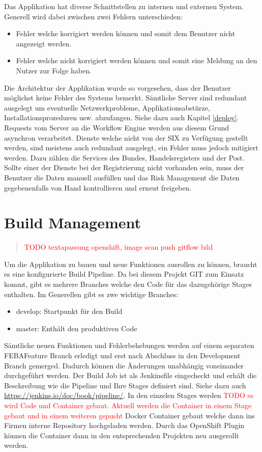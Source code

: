 Das Applikation hat diverse Schnittstellen zu internen und externen System. Generell wird dabei zwischen zwei Fehlern unterschieden:
\begin{itemize}
	\item Fehler welche korrigiert werden können und somit dem Benutzer nicht angezeigt werden.
	\item Fehler welche nicht korrigiert werden können und somit eine Meldung an den Nutzer zur Folge haben.
\end{itemize}
Die Architektur der Applikation wurde so vorgesehen, dass der Benutzer möglichst keine Fehler des Systems bemerkt. Sämtliche Server sind redundant ausgelegt um eventuelle Netzwerkprobleme, Applikationsabstürze, Installationsprozeduren usw. abzufangen. Siehe dazu auch Kapitel \ref{deploy}. Requests vom Server an die Workflow Engine werden aus diesem Grund asynchron verarbeitet.\newline
Dienste welche nicht von der SIX zu Verfügung gestellt werden, sind meistens auch redundant ausgelegt, ein Fehler muss jedoch mitigiert werden. Dazu zählen die Services des Bundes, Handelsregisters und der Post. Sollte einer der Dienste bei der Registrierung nicht vorhanden sein, muss der Benutzer die Daten manuell ausfüllen und das Risk Management die Daten gegebenenfalls von Hand kontrollieren und erneut freigeben.

\section{Build Management}
\label{build}
\begin{quote}
  \textcolor{red}{TODO textapassung openshift, image scan push gitflow bild}
\end{quote}

Um die Applikation zu bauen und neue Funktionen ausrollen zu können, braucht es eine konfigurierte Build Pipeline. Da bei diesem Projekt GIT zum Einsatz kommt, gibt es mehrere Branches welche den Code für das dazugehörige Stages enthalten. Im Generellen gibt es zwe wichtige Branches:
\begin{itemize}
	\item develop: Startpunkt für den Build
	\item master: Enthält den produktiven Code
\end{itemize}
Sämtliche neuen Funktionen und Fehlerbehebungen werden auf einem separaten \Gls{FEBA}Feature Branch erledigt und erst nach Abschluss in den Development Branch gemerged. Dadurch können die Änderungen unabhängig voneinander durchgeführt werden.\newline
Der Build Job ist als Jenkinsfile eingecheckt und erhält die Beschreibung wie die Pipeline und Ihre Stages definiert sind. Siehe dazu auch \url{https://jenkins.io/doc/book/pipeline/}. In den einzelen Stages werden \textcolor{red}{TODO es wird Code und Container gebaut. Aktuell werden die Container in einem Stage gebaut und in einem weiteren gepusht} Docker Container gebaut welche dann ins Firmen interne Repository hochgeladen werden. Durch das OpenShift Plugin können die Container dann in den entsprechenden Projekten neu ausgerollt werden.

